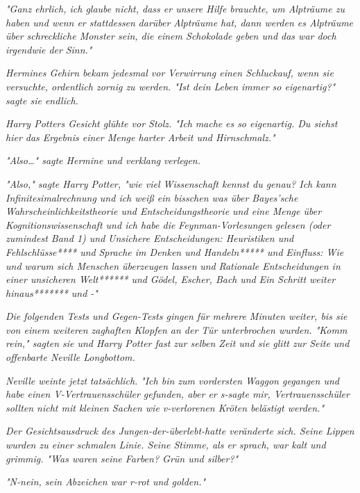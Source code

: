 {\emph{"Ganz ehrlich, ich glaube nicht, dass er unsere Hilfe brauchte, um Alpträume zu haben und wenn er stattdessen} \emph{\emph{darüber}} \emph{Alpträume hat, dann werden es Alpträume über schreckliche Monster sein, die einem Schokolade geben und das war doch irgendwie der} \emph{\emph{Sinn.}"}

\emph{Hermines Gehirn bekam jedesmal vor Verwirrung einen Schluckauf, wenn sie versuchte, ordentlich zornig zu werden. "Ist dein Leben immer so eigenartig?" sagte sie endlich.}

\emph{Harry Potters Gesicht glühte vor Stolz. "Ich} \emph{\emph{mache}} \emph{es so eigenartig. Du siehst hier das Ergebnis einer Menge harter Arbeit und Hirnschmalz."}

\emph{"Also…" sagte Hermine und verklang} \emph{verlegen.}

\emph{"Also," sagte Harry Potter, "wie viel Wissenschaft kennst du genau? Ich kann Infinitesimalrechnung und ich weiß ein bisschen was über Bayes'sche Wahrscheinlichkeitstheorie und Entscheidungstheorie und eine Menge über Kognitionswissenschaft und ich habe die} \emph{\emph{Feynman-Vorlesungen}} \emph{gelesen (oder zumindest Band 1) und} \emph{\emph{Unsichere Entscheidungen: Heuristiken und Fehl}\emph{schlüsse}**** und} \emph{\emph{Sprache im Denken und Handeln}***** und} \emph{\emph{Einfluss: Wie und warum sich Menschen überzeugen lassen}} \emph{und} \emph{\emph{Rationale Entscheidungen in einer unsicheren Welt}****** und} \emph{\emph{Gödel, Escher, Bach}} \emph{und} \emph{\emph{Ein Schritt weiter hinaus}******* und -"}

\emph{Die folgenden Tests und Gegen-Tests gingen für mehrere Minuten weiter, bis sie von einem weiteren zaghaften Klopfen an der Tür unterbrochen wurden. "Komm rein," sagten sie und Harry Potter fast zur selben Zeit und sie glitt zur Seite und offenbarte Neville Longbottom.}

\emph{Neville weinte jetzt} \emph{\emph{tatsächlich.}} \emph{"Ich bin zum vordersten Waggon gegangen und habe einen V-Vertrauensschüler gefunden, aber er s-sagte mir, Vertrauensschüler sollten nicht mit kleinen Sachen wie v-verlorenen Kröten belästigt werden."}

\emph{Der Gesichtsausdruck des Jungen-der-überlebt-hatte veränderte sich. Seine Lippen wurden zu einer schmalen Linie. Seine Stimme, als er sprach, war kalt und grimmig. "Was waren seine Farben? Grün und silber?"}

\emph{"N-nein, sein Abzeichen war r-rot und golden."}

}
